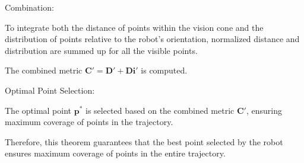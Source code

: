 \vspace*{6mm}  

Combination:

To integrate both the distance of points within the vision cone and the distribution of points relative to the robot's orientation, normalized distance and distribution are summed up for all the visible points. 


The combined metric $\mathbf{C'} = \mathbf{D'} + \mathbf{Di}'$ is computed.

\vspace*{6mm}  

Optimal Point Selection:

The optimal point $\mathbf{p}^*$ is selected based on the combined metric $\mathbf{C'}$, ensuring maximum coverage of points in the trajectory.

\vspace*{6mm}  

Therefore, this theorem guarantees that the best point selected by the robot ensures maximum coverage of points in the entire trajectory. 











